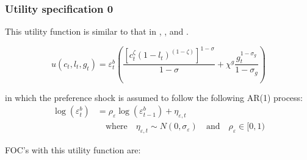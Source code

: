 \documentclass[article,11pt,letterpaper,fleqn]{article}
\theoremstyle{definition}
\numberwithin{equation}{section}
\newcommand{\cn}{\citeasnoun} %
\newcommand\ve{\varepsilon}
\begin{document}
\subsubsection{Utility specification 0}

This utility function is similar to that in \cn{CER2010}, \cn{TY2010}, and \cn{Zubairy2010}.

\begin{equation}
u(c_{t},l_{t},g_{t})= \varepsilon_{t}^{b}\left(\frac{[c_{t}^{\zeta}(1-l_{t})^{(1-\zeta)}]^{1-\sigma}}{1-\sigma}+\chi^{g}\frac{g_{t}^{1-\sigma_{g}}}{1-\sigma_{g}}\right)
\end{equation}

in which the preference shock is assumed to follow the following AR(1) process:
\begin{equation}\label{EqPrefShock}
   \begin{split}
      \log(\ve_t^b) &= \rho_\ve \log(\ve_{t-1}^b) + \eta_{\ve,t} \\
      &\quad\text{where}\quad\eta_{\ve,t}\sim N(0,\sigma_\ve) \quad\text{and}\quad \rho_\ve\in[0,1)
   \end{split}
\end{equation}

FOC's with this utility function are:
\end{document}
